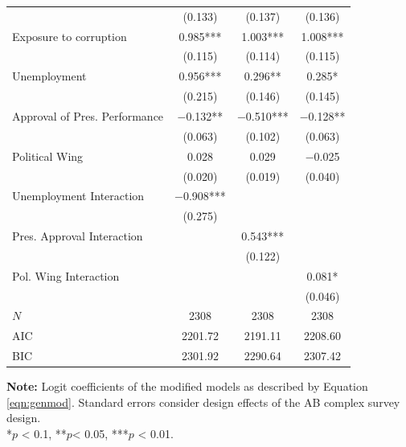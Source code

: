 \documentclass[12pt,a4]{article}\usepackage[]{graphicx}\usepackage[]{xcolor}
\begin{document}
\begin{table}[htbp]
\begin{center}
\begin{tabular}[t]{lccc}
 & (\num{0.133}) & (\num{0.137}) & (\num{0.136})\\
Exposure to corruption & \num{0.985}*** & \num{1.003}*** & \num{1.008}***\\
 & (\num{0.115}) & (\num{0.114}) & (\num{0.115})\\
Unemployment & \num{0.956}*** & \num{0.296}** & \num{0.285}*\\
 & (\num{0.215}) & (\num{0.146}) & (\num{0.145})\\
Approval of Pres. Performance & \num{-0.132}** & \num{-0.510}*** & \num{-0.128}**\\
 & (\num{0.063}) & (\num{0.102}) & (\num{0.063})\\
Political Wing & \num{0.028} & \num{0.029} & \num{-0.025}\\
 & (\num{0.020}) & (\num{0.019}) & (\num{0.040})\\
Unemployment Interaction & \num{-0.908}*** &  & \\
 & (\num{0.275}) &  & \\
Pres. Approval Interaction &  & \num{0.543}*** & \\
 &  & (\num{0.122}) & \\
Pol. Wing Interaction &  &  & \num{0.081}*\\
 &  &  & (\num{0.046})\\
\midrule
$N$ & \num{2308} & \num{2308} & \num{2308}\\
AIC & \num{2201.72} & \num{2191.11} & \num{2208.60}\\
BIC & \num{2301.92} & \num{2290.64} & \num{2307.42}\\
\bottomrule
\end{tabular}


\end{center}
\textbf{Note:} Logit coefficients of the modified models as described by Equation \ref{eqn:genmod}. Standard errors consider design effects of the AB complex survey design.\\
*$p$ < 0.1, **$p$< 0.05, ***$p$ < 0.01.
\end{table}
\end{document}
